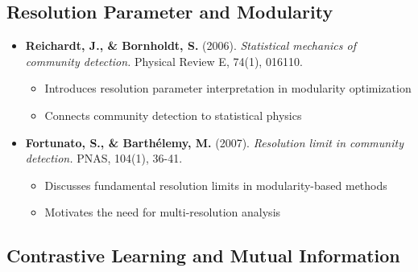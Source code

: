 \documentclass[11pt,a4paper]{article}
\begin{document}
\subsection{Resolution Parameter and Modularity}

\begin{itemize}[leftmargin=*]
    \item \textbf{Reichardt, J., \& Bornholdt, S.} (2006). \textit{Statistical mechanics of community detection.} Physical Review E, 74(1), 016110.
    \begin{itemize}
        \item Introduces resolution parameter interpretation in modularity optimization
        \item Connects community detection to statistical physics
    \end{itemize}
    
    \item \textbf{Fortunato, S., \& Barthélemy, M.} (2007). \textit{Resolution limit in community detection.} PNAS, 104(1), 36-41.
    \begin{itemize}
        \item Discusses fundamental resolution limits in modularity-based methods
        \item Motivates the need for multi-resolution analysis
    \end{itemize}
\end{itemize}

\subsection{Contrastive Learning and Mutual Information}
\end{document}
